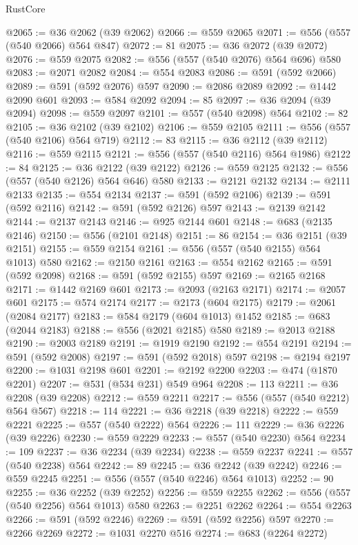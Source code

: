 \begin{lexlean}{RustCore}
\begin{coremodule}
@2065 := @36 @2062 (@39 @2062)
@2066 := @559 @2065
@2071 := @556 (@557 (@540 @2066) @564 @847)
@2072 := 81
@2075 := @36 @2072 (@39 @2072)
@2076 := @559 @2075
@2082 := @556 (@557 (@540 @2076) @564 @696) @580
@2083 := @2071 @2082
@2084 := @554 @2083
@2086 := @591 (@592 @2066)
@2089 := @591 (@592 @2076) @597
@2090 := @2086 @2089
@2092 := @1442 @2090 @601
@2093 := @584 @2092
@2094 := 85
@2097 := @36 @2094 (@39 @2094)
@2098 := @559 @2097
@2101 := @557 (@540 @2098) @564
@2102 := 82
@2105 := @36 @2102 (@39 @2102)
@2106 := @559 @2105
@2111 := @556 (@557 (@540 @2106) @564 @719)
@2112 := 83
@2115 := @36 @2112 (@39 @2112)
@2116 := @559 @2115
@2121 := @556 (@557 (@540 @2116) @564 @1986)
@2122 := 84
@2125 := @36 @2122 (@39 @2122)
@2126 := @559 @2125
@2132 := @556 (@557 (@540 @2126) @564 @646) @580
@2133 := @2121 @2132
@2134 := @2111 @2133
@2135 := @554 @2134
@2137 := @591 (@592 @2106)
@2139 := @591 (@592 @2116)
@2142 := @591 (@592 @2126) @597
@2143 := @2139 @2142
@2144 := @2137 @2143
@2146 := @925 @2144 @601
@2148 := @683 (@2135 @2146)
@2150 := @556 (@2101 @2148)
@2151 := 86
@2154 := @36 @2151 (@39 @2151)
@2155 := @559 @2154
@2161 := @556 (@557 (@540 @2155) @564 @1013) @580
@2162 := @2150 @2161
@2163 := @554 @2162
@2165 := @591 (@592 @2098)
@2168 := @591 (@592 @2155) @597
@2169 := @2165 @2168
@2171 := @1442 @2169 @601
@2173 := @2093 (@2163 @2171)
@2174 := @2057 @601
@2175 := @574 @2174
@2177 := @2173 (@604 @2175)
@2179 := @2061 (@2084 @2177)
@2183 := @584 @2179 (@604 @1013) @1452
@2185 := @683 (@2044 @2183)
@2188 := @556 (@2021 @2185) @580
@2189 := @2013 @2188
@2190 := @2003 @2189
@2191 := @1919 @2190
@2192 := @554 @2191
@2194 := @591 (@592 @2008)
@2197 := @591 (@592 @2018) @597
@2198 := @2194 @2197
@2200 := @1031 @2198 @601
@2201 := @2192 @2200
@2203 := @474 (@1870 @2201)
@2207 := @531 (@534 @231) @549 @964
@2208 := 113
@2211 := @36 @2208 (@39 @2208)
@2212 := @559 @2211
@2217 := @556 (@557 (@540 @2212) @564 @567)
@2218 := 114
@2221 := @36 @2218 (@39 @2218)
@2222 := @559 @2221
@2225 := @557 (@540 @2222) @564
@2226 := 111
@2229 := @36 @2226 (@39 @2226)
@2230 := @559 @2229
@2233 := @557 (@540 @2230) @564
@2234 := 109
@2237 := @36 @2234 (@39 @2234)
@2238 := @559 @2237
@2241 := @557 (@540 @2238) @564
@2242 := 89
@2245 := @36 @2242 (@39 @2242)
@2246 := @559 @2245
@2251 := @556 (@557 (@540 @2246) @564 @1013)
@2252 := 90
@2255 := @36 @2252 (@39 @2252)
@2256 := @559 @2255
@2262 := @556 (@557 (@540 @2256) @564 @1013) @580
@2263 := @2251 @2262
@2264 := @554 @2263
@2266 := @591 (@592 @2246)
@2269 := @591 (@592 @2256) @597
@2270 := @2266 @2269
@2272 := @1031 @2270 @516
@2274 := @683 (@2264 @2272)

\end{coremodule}
\end{lexlean}
